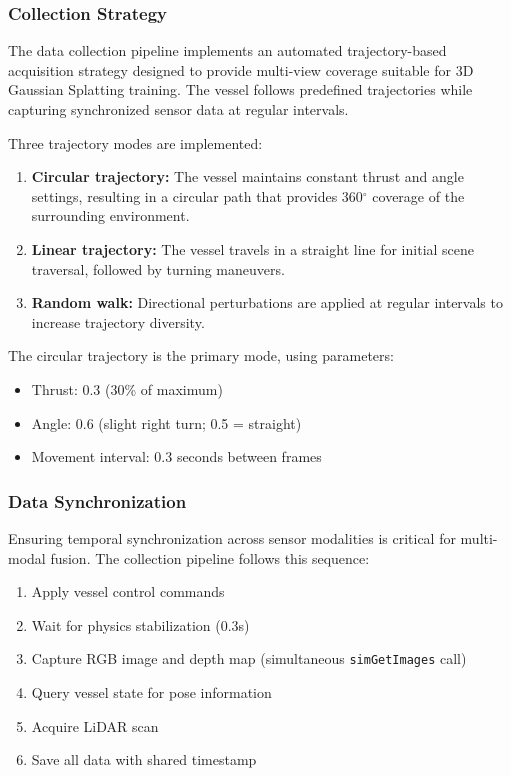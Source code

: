 \subsubsection{Collection Strategy}

The data collection pipeline implements an automated trajectory-based acquisition strategy designed to provide multi-view coverage suitable for 3D Gaussian Splatting training. The vessel follows predefined trajectories while capturing synchronized sensor data at regular intervals.

Three trajectory modes are implemented:

\begin{enumerate}
    \item \textbf{Circular trajectory:} The vessel maintains constant thrust and angle settings, resulting in a circular path that provides 360$^\circ$ coverage of the surrounding environment.

    \item \textbf{Linear trajectory:} The vessel travels in a straight line for initial scene traversal, followed by turning maneuvers.

    \item \textbf{Random walk:} Directional perturbations are applied at regular intervals to increase trajectory diversity.
\end{enumerate}

The circular trajectory is the primary mode, using parameters:

\begin{itemize}
    \item Thrust: 0.3 (30\% of maximum)
    \item Angle: 0.6 (slight right turn; 0.5 = straight)
    \item Movement interval: 0.3 seconds between frames
\end{itemize}

\subsubsection{Data Synchronization}

Ensuring temporal synchronization across sensor modalities is critical for multi-modal fusion. The collection pipeline follows this sequence:

\begin{enumerate}
    \item Apply vessel control commands
    \item Wait for physics stabilization (0.3s)
    \item Capture RGB image and depth map (simultaneous \texttt{simGetImages} call)
    \item Query vessel state for pose information
    \item Acquire LiDAR scan
    \item Save all data with shared timestamp
\end{enumerate}

